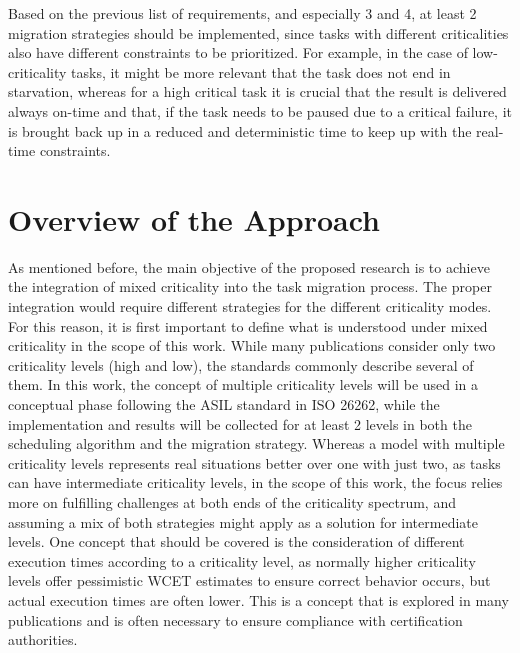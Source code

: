 \begin{center}
\end{center}

Based on the previous list of requirements, and especially 3 and 4, at least 2 migration strategies should be implemented, since tasks with different criticalities also have different constraints to be prioritized. For example, in the case of low-criticality tasks, it might be more relevant that the task does not end in starvation, whereas for a high critical task it is crucial that the result is delivered always on-time and that, if the task needs to be paused due to a critical failure, it is brought back up in a reduced and deterministic time to keep up with the real-time constraints.



\section{Overview of the Approach}\label{section:descriptionapproach}

As mentioned before, the main objective of the proposed research is to achieve the integration of mixed criticality into the task migration process. The proper integration would require different strategies for the different criticality modes. For this reason, it is first important to define what is understood under mixed criticality in the scope of this work. While many publications consider only two criticality levels (high and low), the standards commonly describe several of them. In this work, the concept of multiple criticality levels will be used in a conceptual phase following the ASIL standard in ISO 26262, while the implementation and results will be collected for at least 2 levels in both the scheduling algorithm and the migration strategy. Whereas a model with multiple criticality levels represents real situations better over one with just two, as tasks can have intermediate criticality levels, in the scope of this work, the focus relies more on fulfilling challenges at both ends of the criticality spectrum, and assuming a mix of both strategies might apply as a solution for intermediate levels. One concept that should be covered is the consideration of different execution times according to a criticality level, as normally higher criticality levels offer pessimistic WCET estimates to ensure correct behavior occurs, but actual execution times are often lower. This is a concept that is explored in many publications and is often necessary to ensure compliance with certification authorities.

